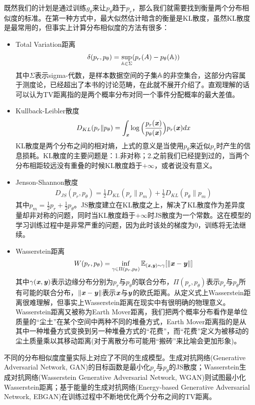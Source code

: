 既然我们的计划是通过训练$g_{\theta}$来让$p_{\theta}$趋于$p_{r}$，那么我们就需要找到衡量两个分布相似度的标准。在第一种方式中，最大似然估计暗含的衡量是KL散度，虽然KL散度是最常用的，但事实上计算分布相似度的方法有很多：
\begin{itemize}
	\setlength{\itemsep}{0pt}
    \setlength{\parsep}{0pt}
    \setlength{\parskip}{0pt}
	\item Total Variation距离
	\begin{eqnarray}
	\delta(p_{r},p_{\theta}) = \sup_{\mathbb{A}\in\Sigma}(p_{r}(A) - p_{\theta}(\mathbb{A}))
	\end{eqnarray}
	其中$\Sigma$表示sigma-代数，是样本数据空间的子集$\mathbb{A}$的非空集合，这部分内容属于测度论，已经超出了本书的讨论范畴，在此就不展开介绍了。直观理解的话可以认为TV距离指的是两个概率分布对同一个事件分配概率的最大差值。\\
	\item Kullback-Leibler散度
	\begin{eqnarray}
	D_{KL}(p_{r}\|p_{\theta}) = \int_{\Vx}\log\Big{(} \frac{p_{r}(\Vx)}{p_{\theta}(\Vx)} \Big{)}p_{r}(\Vx)dx
	\end{eqnarray}
	KL散度是两个分布之间的相对熵，上式的意义是当使用$p_{\theta}$来近似$p_{r}$时产生的信息损耗。KL散度的主要问题是：1.非对称；2.之前我们已经提到过的，当两个分布相距较远没有重叠的时候KL散度趋于$+\infty$，或者说没有意义。\\
	\item Jenson-Shannon散度
	\begin{eqnarray}
	D_{JS}(p_{r},p_{\theta}) = \frac{1}{2}D_{KL}(p_{r}\|p_{m}) + \frac{1}{2}D_{KL}(p_{\theta}\|p_{m})
	\end{eqnarray}
	其中$p_{m}=\frac{1}{2}p_{r}+\frac{1}{2}p_{\theta}$。JS散度建立在KL散度之上，解决了KL散度作为差异度量却非对称的问题，同时当KL散度趋于$+\infty$时JS散度为一个常数。这在模型的学习训练过程中是非常严重的问题，因为此时该处的梯度为$0$，训练将无法继续。\\
	\item Wasserstein距离
	\begin{eqnarray}
	W(p_{r},p_{\theta}) = \inf_{\gamma\in\Pi(p_{r},p_{\theta})} \mathbb{E}_{(\boldsymbol{\mathit{x}},\boldsymbol{\mathit{y}})\sim\gamma}[\|\boldsymbol{\mathit{x}}-\boldsymbol{\mathit{y}}\|] \label{eqn:Wasserstein}
	\end{eqnarray}
	其中$\gamma(\boldsymbol{\mathit{x}},\boldsymbol{\mathit{y}})$表示边缘分布分别为$p_{r}$与$p_{\theta}$的联合分布，$\Pi(p_{r},p_{\theta})$表示$p_{r}$与$p_{\theta}$所有可能的联合分布，$\|\boldsymbol{\mathit{x}}-\boldsymbol{\mathit{y}}\|$表示$\boldsymbol{\mathit{x}}$与$\boldsymbol{\mathit{y}}$的欧氏距离。从定义式上Wasserstein距离很难理解，但事实上Wasserstein距离在现实中有很明确的物理意义。Wasserstein距离又被称为Earth Mover距离，我们把两个概率分布看作是单位质量的“尘土”在某个空间中两种不同的堆叠方式，Earth Mover距离指的是从其中一种堆叠方式变换到另一种堆叠方式的“花费”，而“花费”定义为被移动的尘土质量乘以其移动距离(对于离散分布可能用“搬砖”来比喻会更加形象)。
\end{itemize}
不同的分布相似度度量实际上对应了不同的生成模型。生成对抗网络(Generative Adversarial Network, GAN)的目标函数是最小化$p_{r}$与$p_{\theta}$的JS散度；Wasserstein生成对抗网络(Wasserstein Generative Adversarial Network, WGAN)则试图最小化Wasserstein距离；基于能量的生成对抗网络(Energy-based Generative Adversarial Network, EBGAN)在训练过程中不断地优化两个分布之间的TV距离。

